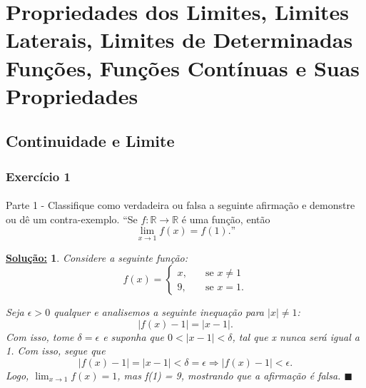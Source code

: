 \documentclass{article}
\newtheorem*{sol*}{\underline{Solu\c c\~ao:}}
\renewcommand\qedsymbol{$\blacksquare$}
\begin{document}
\newpage

\section{Propriedades dos Limites, Limites Laterais, Limites de Determinadas Fun\c c\~oes, Fun\c c\~oes Cont\'inuas e Suas Propriedades}
\subsection{Continuidade e Limite}
\subsubsection{Exerc\'icio 1}
\paragraph{} Parte 1 - Classifique como verdadeira ou falsa a seguinte afirma\c c\~ao e demonstre ou d\^e um contra-exemplo.
``Se $f: \mathbb{R}\rightarrow\mathbb{R}$ \'e uma fun\c c\~ao, ent\~ao
$$
\lim_{x\to{1}}f(x) = f(1).\text{''}
$$
\begin{sol*}
Considere a seguinte fun\c c\~ao:
$$
f(x) = \left\{
\begin{array}{ll}
	x, &\quad \text{se } x\neq{1}\\
	9, & \quad \text{se } x=1.
\end{array}
\right.
$$

Seja $\epsilon > 0$ qualquer e analisemos a seguinte inequa\c c\~ao para $|x|\neq 1$:
$$
	|f(x) - 1| = |x - 1|.
$$
Com isso, tome $\delta = \epsilon$ e suponha que $0 < |x - 1| < \delta$, tal que x nunca ser\'a igual a 1. Com isso, segue que 
$$
	|f(x) - 1| = |x - 1| < \delta = \epsilon \Rightarrow |f(x) - 1| < \epsilon.
$$
Logo, $\lim_{x\to{1}}f(x) = 1$, mas f(1) = 9, mostrando que a afirma\c c\~ao \'e falsa.
\qedsymbol
\end{sol*}
\end{document}
